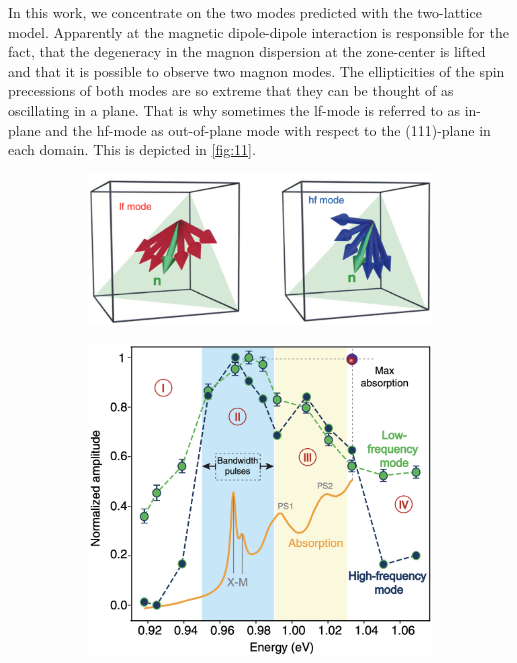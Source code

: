 In this work, we concentrate on the two modes predicted with the two-lattice model.
Apparently at the magnetic dipole-dipole interaction is responsible for the fact, that the degeneracy in the magnon dispersion at the zone-center is lifted and that it is possible to observe two magnon modes. 
The ellipticities of the spin precessions of both modes are so extreme that they can be thought of as oscillating in a plane.
That is why sometimes the lf-mode is referred to as in-plane and the hf-mode as out-of-plane mode with respect to the (111)-plane in each domain. This is depicted in \autoref{fig:11}.
\begin{figure}[ht]
    \centering
    \begin{subfigure}[c]{0.5\textwidth}
        \includegraphics[width=\textwidth]{pictures/11.png}
        \caption{}
        \label{fig:11}
    \end{subfigure}
    \hspace{0.4cm}
    \begin{subfigure}[c]{0.45\textwidth}
        \includegraphics[width=\textwidth]{pictures/7.png}

\end{subfigure}
\end{figure}
